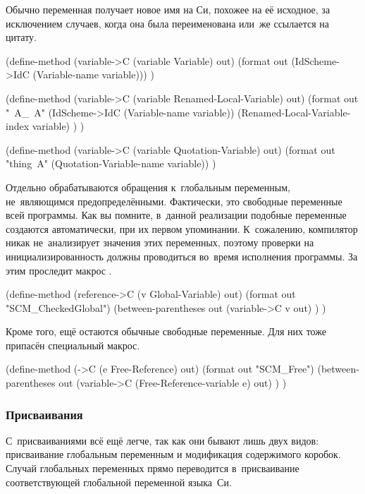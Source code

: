 Обычно переменная получает новое имя на Си, похожее на её исходное, за
исключением случаев, когда она была переименована или~же ссылается на цитату.

\begin{code:lisp}
(define-method (variable->C (variable Variable) out)
  (format out (IdScheme->IdC (Variable-name variable))) )

(define-method (variable->C (variable Renamed-Local-Variable) out)
  (format out "~A_~A"
          (IdScheme->IdC (Variable-name variable))
          (Renamed-Local-Variable-index variable) ) )

(define-method (variable->C (variable Quotation-Variable) out)
  (format out "thing~A" (Quotation-Variable-name variable)) )
\end{code:lisp}

Отдельно обрабатываются обращения к~глобальным переменным, не~являющимся
предопределёнными. Фактически, это свободные переменные всей программы. Как вы
помните, в~данной реализации подобные переменные создаются автоматически, при их
первом упоминании. К~сожалению, компилятор никак не~анализирует значения этих
переменных, поэтому проверки на инициализированность должны проводиться во~время
исполнения программы. За этим проследит макрос .

\begin{code:lisp}
(define-method (reference->C (v Global-Variable) out)
  (format out "SCM_CheckedGlobal")
  (between-parentheses out
    (variable->C v out) ) )
\end{code:lisp}

Кроме того, ещё остаются обычные свободные переменные. Для них тоже припасён
специальный макрос.

\begin{code:lisp}
(define-method (->C (e Free-Reference) out)
  (format out "SCM_Free")
  (between-parentheses out
    (variable->C (Free-Reference-variable e) out) ) )
\end{code:lisp}


\subsubsection{Присваивания}\label{cc/gen/exprs/sssect:assignments}

С~присваиваниями всё ещё легче, так как они бывают лишь двух видов: присваивание
глобальным переменным и модификация содержимого коробок. Случай глобальных
переменных прямо переводится в~присваивание соответствующей глобальной
переменной языка~Си.

